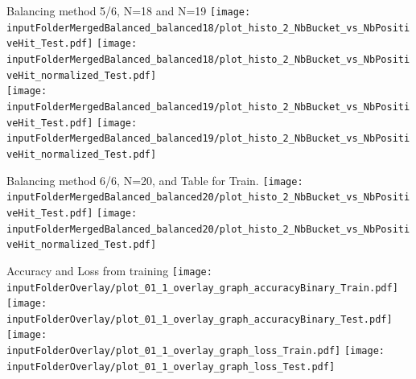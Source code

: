 \documentclass{beamer}
\begin{document}
\begin{frame}{Balancing method 5/6, N=18 and N=19}
\texttt{[image: \\inputFolderMergedBalanced\_balanced18/plot\_histo\_2\_NbBucket\_vs\_NbPositiveHit\_Test.pdf]}
\texttt{[image: \\inputFolderMergedBalanced\_balanced18/plot\_histo\_2\_NbBucket\_vs\_NbPositiveHit\_normalized\_Test.pdf]}\\
\texttt{[image: \\inputFolderMergedBalanced\_balanced19/plot\_histo\_2\_NbBucket\_vs\_NbPositiveHit\_Test.pdf]}
\texttt{[image: \\inputFolderMergedBalanced\_balanced19/plot\_histo\_2\_NbBucket\_vs\_NbPositiveHit\_normalized\_Test.pdf]}
\end{frame}
\clearpage



\begin{frame}{Balancing method 6/6, N=20, and Table for Train.}
\texttt{[image: \\inputFolderMergedBalanced\_balanced20/plot\_histo\_2\_NbBucket\_vs\_NbPositiveHit\_Test.pdf]}
\texttt{[image: \\inputFolderMergedBalanced\_balanced20/plot\_histo\_2\_NbBucket\_vs\_NbPositiveHit\_normalized\_Test.pdf]}
\begin{table}[ht]
\centering
{}
\caption{Caption} 
\end{table} 
\end{frame}
\clearpage

\begin{frame}{Accuracy and Loss from training}
\texttt{[image: \\inputFolderOverlay/plot\_01\_1\_overlay\_graph\_accuracyBinary\_Train.pdf]}
\texttt{[image: \\inputFolderOverlay/plot\_01\_1\_overlay\_graph\_accuracyBinary\_Test.pdf]}\\
\texttt{[image: \\inputFolderOverlay/plot\_01\_1\_overlay\_graph\_loss\_Train.pdf]}
\texttt{[image: \\inputFolderOverlay/plot\_01\_1\_overlay\_graph\_loss\_Test.pdf]}
\end{frame}
\clearpage
\end{document}
